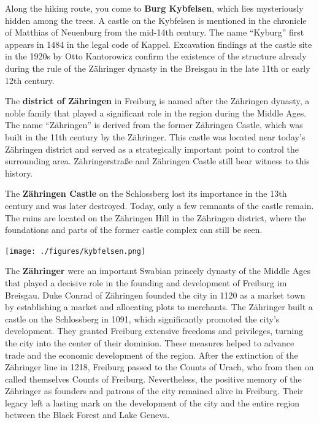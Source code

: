 \documentclass[landscape, a4paper]{article}
\newcommand\alert[1]{\textcolor{PrimaryColor}{\textbf{#1}}}
\begin{document}
\begin{minipage}[t]{0.31\textwidth}
	\setlength{\parskip}{0.25cm}
	\vspace{0cm}

  Along the hiking route, you come to \alert{Burg Kybfelsen}, which lies mysteriously hidden among the trees. A castle on the Kybfelsen is mentioned in the chronicle of Matthias of Neuenburg from the mid-14th century. The name \enquote{Kyburg} first appears in 1484 in the legal code of Kappel. Excavation findings at the castle site in the 1920s by Otto Kantorowicz confirm the existence of the structure already during the rule of the Zähringer dynasty in the Breisgau in the late 11th or early 12th century. %

The \alert{district of Zähringen} in Freiburg is named after the Zähringen dynasty, a noble family that played a significant role in the region during the Middle Ages. The name \enquote{Zähringen} is derived from the former Zähringen Castle, which was built in the 11th century by the Zähringer. This castle was located near today’s Zähringen district and served as a strategically important point to control the surrounding area. Zähringerstraße and Zähringen Castle still bear witness to this history.

The \alert{Zähringen Castle} on the Schlossberg lost its importance in the 13th century and was later destroyed. Today, only a few remnants of the castle remain. The ruins are located on the Zähringen Hill in the Zähringen district, where the foundations and parts of the former castle complex can still be seen.

	\texttt{[image: ./figures/kybfelsen.png]}
	\setlength{\parskip}{0.25cm}

  The \alert{Zähringer} were an important Swabian princely dynasty of the Middle Ages that played a decisive role in the founding and development of Freiburg im Breisgau. Duke Conrad of Zähringen founded the city in 1120 as a market town by establishing a market and allocating plots to merchants. The Zähringer built a castle on the Schlossberg in 1091, which significantly promoted the city's development. They granted Freiburg extensive freedoms and privileges, turning the city into the center of their dominion. These measures helped to advance trade and the economic development of the region. After the extinction of the Zähringer line in 1218, Freiburg passed to the Counts of Urach, who from then on called themselves Counts of Freiburg. Nevertheless, the positive memory of the Zähringer as founders and patrons of the city remained alive in Freiburg. Their legacy left a lasting mark on the development of the city and the entire region between the Black Forest and Lake Geneva.


\end{minipage}
\end{document}
